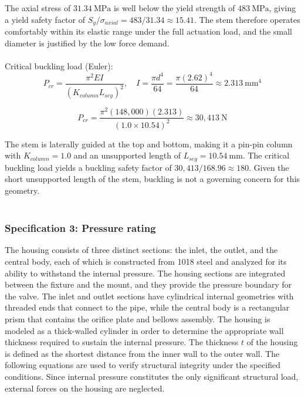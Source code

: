 \documentclass[12pt, letterpaper]{report}%
\newcounter{mycounter}           %
\newcounter{sub}[mycounter]      %
\begin{document}
                The axial stress of $31.34\ \text{MPa}$ is well below the yield strength of $483\ \text{MPa}$, giving a yield safety factor of $S_y / \sigma_{axial} = 483 / 31.34 \approx 15.41$.
                The stem therefore operates comfortably within its elastic range under the full actuation load, and the small diameter is justified by the low force demand.
                \\~\\
                Critical buckling load (Euler):
                \begin{equation}
                P_{cr} = \frac{\pi^2 E I}{(K_{column} L_{seg})^2}, \quad I = \frac{\pi d^4}{64} = \frac{\pi (2.62)^4}{64} \approx 2.313 \ \text{mm}^4
                \label{crit_buck}
                \end{equation}

                \begin{equation}
                P_{cr} = \frac{\pi^2 (148{,}000)(2.313)}{(1.0 \times 10.54)^2} \approx 30{,}413 \ \text{N}
                \label{crit_buck2}    
                \end{equation}

                The stem is laterally guided at the top and bottom, making it a pin-pin column with $K_{column} = 1.0$ and an unsupported length of $L_{seg} = 10.54\ \text{mm}$.
                The critical buckling load yields a buckling safety factor of $30{,}413 / 168.96 \approx 180$.
                Given the short unsupported length of the stem, buckling is not a governing concern for this geometry.
                \\~\\

        \subsubsection{Specification 3: Pressure rating}
        \label{subsec:valve_spec_3}

            The housing consists of three distinct sections: the inlet, the outlet, and the central body, each of which is constructed from 1018 steel and analyzed for its ability to withstand the internal pressure. 
            The housing sections are integrated between the fixture and the mount, and they provide the pressure boundary for the valve. The inlet and outlet sections have cylindrical internal geometries with threaded ends that connect to the pipe, while the central body is a rectangular prism that contains the orifice plate and bellows assembly.
            The housing is modeled as a thick-walled cylinder in order to determine the appropriate wall thickness required to sustain the internal pressure.
            The thickness $t$ of the housing is defined as the shortest distance from the inner wall to the outer wall.
            The following equations are used to verify structural integrity under the specified conditions.
            Since internal pressure constitutes the only significant structural load, external forces on the housing are neglected.
\end{document}
